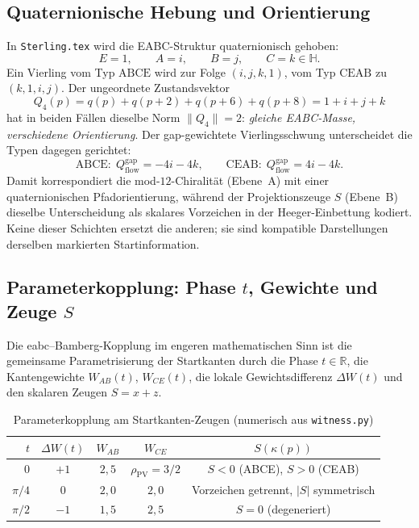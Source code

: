 \documentclass[11pt,a4paper]{article}
\theoremstyle{definition}
\theoremstyle{plain}
\newcommand{\R}{\mathbb{R}}
\newcommand{\rhoPV}{\rho_{\mathrm{PV}}}
\begin{document}
	\subsection{Quaternionische Hebung und Orientierung}
	
	In \texttt{Sterling.tex} wird die EABC-Struktur quaternionisch gehoben:
	\[
	E=1,\qquad A=i,\qquad B=j,\qquad C=k\in\mathbb{H}.
	\]
	Ein Vierling vom Typ $\mathrm{ABCE}$ wird zur Folge $(i,j,k,1)$, vom Typ $\mathrm{CEAB}$ zu $(k,1,i,j)$. Der ungeordnete Zustandsvektor
	\[
	Q_4(p)=q(p)+q(p+2)+q(p+6)+q(p+8)=1+i+j+k
	\]
	hat in beiden Fällen dieselbe Norm $\|Q_4\|=2$: \emph{gleiche EABC-Masse, verschiedene Orientierung}. Der gap-gewichtete Vierlingsschwung unterscheidet die Typen dagegen gerichtet:
	\[
	\mathrm{ABCE}:\;Q_{\mathrm{flow}}^{\mathrm{gap}}=-4i-4k,
	\qquad
	\mathrm{CEAB}:\;Q_{\mathrm{flow}}^{\mathrm{gap}}=4i-4k.
	\]
	Damit korrespondiert die mod-$12$-Chiralität (Ebene~A) mit einer quaternionischen Pfadorientierung, während der Projektionszeuge $S$ (Ebene~B) dieselbe Unterscheidung als skalares Vorzeichen in der Heeger-Einbettung kodiert. Keine dieser Schichten ersetzt die anderen; sie sind kompatible Darstellungen derselben markierten Startinformation.
	
	\subsection{Parameterkopplung: Phase $t$, Gewichte und Zeuge $S$}
	
	Die eabc--Bamberg-Kopplung im engeren mathematischen Sinn ist die gemeinsame Parametrisierung der Startkanten durch die Phase $t\in\R$, die Kantengewichte $W_{AB}(t)$, $W_{CE}(t)$, die lokale Gewichtsdifferenz $\Delta W(t)$ und den skalaren Zeugen $S=x+z$.
	
	\begin{table}[htbp]
		\centering
		\caption{Parameterkopplung am Startkanten-Zeugen (numerisch aus \texttt{witness.py})}
		\label{tab:kopplung}
		\begin{tabular}{@{}rcccc@{}}
			\toprule
			$t$ & $\Delta W(t)$ & $W_{AB}$ & $W_{CE}$ & $S(\kappa(p))$ \\
			\midrule
			$0$ & $+1$ & $2{,}5$ & $\rhoPV=3/2$ & $S<0$ (ABCE), $S>0$ (CEAB) \\
			$\pi/4$ & $0$ & $2{,}0$ & $2{,}0$ & Vorzeichen getrennt, $|S|$ symmetrisch \\
			$\pi/2$ & $-1$ & $1{,}5$ & $2{,}5$ & $S=0$ (degeneriert) \\
			\bottomrule
		\end{tabular}
	\end{table}
	
\end{document}
